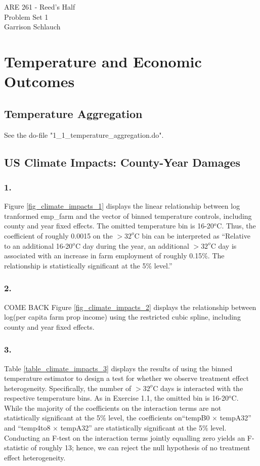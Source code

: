 \documentclass[12pt]{article}
\begin{document}
\begin{center}
ARE 261 - Reed's Half \\
Problem Set 1 \\
Garrison Schlauch
\end{center}

\section{Temperature and Economic Outcomes}

\subsection{Temperature Aggregation}
See the do-file "1_1_temperature_aggregation.do".

\subsection{US Climate Impacts: County-Year Damages}

\subsubsection*{1.}
Figure \ref{fig_climate_impacts_1} displays the linear relationship between log tranformed emp\_farm and the vector of binned temperature controls, including county and year fixed effects. The omitted temperature bin is 16-20$^o$C. Thus, the coefficient of roughly 0.0015 on the $>32^o$C bin can be interpreted as ``Relative to an additional 16-20$^o$C day during the year, an additional $>32^o$C day is associated with an increase in farm employment of roughly 0.15\%. The relationship is statistically significant at the 5\% level.''

\subsubsection*{2.}
COME BACK
Figure \ref{fig_climate_impacts_2} displays the relationship between log(per capita farm prop income) using the restricted cubic spline, including county and year fixed effects.

\subsubsection*{3.}
Table \ref{table_climate_impacts_3} displays the results of using the binned temperature estimator to design a test for whether we observe treatment effect heterogeneity. Specifically, the number of $>32^o$C days is interacted with the respective temperature bins. As in Exercise 1.1, the omitted bin is 16-20$^o$C. While the majority of the coefficients on the interaction terms are not statistically significant at the 5\% level, the coefficients on``tempB0 $\times$ tempA32'' and ``temp4to8 $\times$ tempA32'' are statistically significant at the 5\% level. Conducting an F-test on the interaction terms jointly equalling zero yields an F-statistic of roughly 13; hence, we can reject the null hypothesis of no treatment effect heterogeneity.
\end{document}

